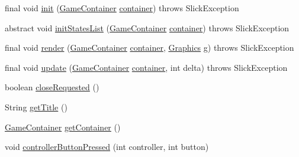 \begin{DoxyCompactItemize}
\item 
final void \mbox{\hyperlink{classorg_1_1newdawn_1_1slick_1_1state_1_1_state_based_game_aa272bccd1d7e57478dd49cc01ccf4c36}{init}} (\mbox{\hyperlink{classorg_1_1newdawn_1_1slick_1_1_game_container}{Game\+Container}} \mbox{\hyperlink{classorg_1_1newdawn_1_1slick_1_1state_1_1_state_based_game_a538846600436175cbed48450adfdd025}{container}})  throws Slick\+Exception 
\item 
abstract void \mbox{\hyperlink{classorg_1_1newdawn_1_1slick_1_1state_1_1_state_based_game_af62d7a82f042c5b2d73e102ab94a07c0}{init\+States\+List}} (\mbox{\hyperlink{classorg_1_1newdawn_1_1slick_1_1_game_container}{Game\+Container}} \mbox{\hyperlink{classorg_1_1newdawn_1_1slick_1_1state_1_1_state_based_game_a538846600436175cbed48450adfdd025}{container}})  throws Slick\+Exception
\item 
final void \mbox{\hyperlink{classorg_1_1newdawn_1_1slick_1_1state_1_1_state_based_game_ae7832a5a852c1343e0abebf031bdc12a}{render}} (\mbox{\hyperlink{classorg_1_1newdawn_1_1slick_1_1_game_container}{Game\+Container}} \mbox{\hyperlink{classorg_1_1newdawn_1_1slick_1_1state_1_1_state_based_game_a538846600436175cbed48450adfdd025}{container}}, \mbox{\hyperlink{classorg_1_1newdawn_1_1slick_1_1_graphics}{Graphics}} g)  throws Slick\+Exception 
\item 
final void \mbox{\hyperlink{classorg_1_1newdawn_1_1slick_1_1state_1_1_state_based_game_a14ceb4a8ffc0cb90f9b8f6de8aa5f42f}{update}} (\mbox{\hyperlink{classorg_1_1newdawn_1_1slick_1_1_game_container}{Game\+Container}} \mbox{\hyperlink{classorg_1_1newdawn_1_1slick_1_1state_1_1_state_based_game_a538846600436175cbed48450adfdd025}{container}}, int delta)  throws Slick\+Exception 
\item 
boolean \mbox{\hyperlink{classorg_1_1newdawn_1_1slick_1_1state_1_1_state_based_game_af31408ebd2398cc30cbf77a3580cc3f3}{close\+Requested}} ()
\item 
String \mbox{\hyperlink{classorg_1_1newdawn_1_1slick_1_1state_1_1_state_based_game_a03a2277e7ca503ffd922b68b497f8d5b}{get\+Title}} ()
\item 
\mbox{\hyperlink{classorg_1_1newdawn_1_1slick_1_1_game_container}{Game\+Container}} \mbox{\hyperlink{classorg_1_1newdawn_1_1slick_1_1state_1_1_state_based_game_abb46a56449db254b6d677879dedbb6bd}{get\+Container}} ()
\item 
void \mbox{\hyperlink{classorg_1_1newdawn_1_1slick_1_1state_1_1_state_based_game_a86b1ef633750d400262209bd8d6c2059}{controller\+Button\+Pressed}} (int controller, int button)

\end{DoxyCompactItemize}

